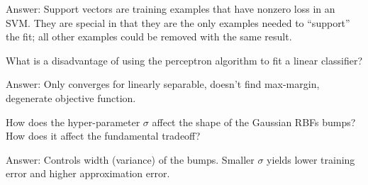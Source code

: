 \documentclass{article}
\def\ans#1{\par\gre{Answer: #1}}
\def\gre#1{{\color{gre}#1}}
\begin{document}
{{\ans{Support vectors are training examples that have nonzero loss in an SVM. They are special in that they are the only examples needed to ``support'' the fit; all other examples could be removed with the same result.}
\item What is a disadvantage of using the perceptron algorithm to fit a linear classifier?
\ans{Only converges for linearly separable, doesn't find max-margin, degenerate objective function.}
\item How does the hyper-parameter $\sigma$ affect the shape of the Gaussian RBFs bumps? How does it affect the fundamental tradeoff?
\ans{Controls width (variance) of the bumps. Smaller $\sigma$ yields lower training error and higher approximation error.}
}
}

\end{document}
